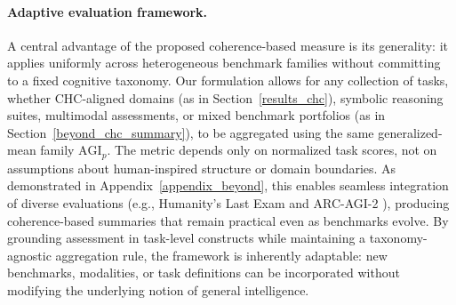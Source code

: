 \documentclass{article}
\begin{document}
\paragraph{Adaptive evaluation framework.}
A central advantage of the proposed coherence-based measure is its generality: it applies uniformly across heterogeneous benchmark families without committing to a fixed cognitive taxonomy. Our formulation allows for any collection of tasks, whether CHC-aligned domains (as in Section~\ref{results_chc}), symbolic reasoning suites, multimodal assessments, or mixed benchmark portfolios (as in Section~\ref{beyond_chc_summary}), to be aggregated using the same generalized-mean family $\mathrm{AGI}_p$. The metric depends only on normalized task scores, not on assumptions about human-inspired structure or domain boundaries. As demonstrated in Appendix~\ref{appendix_beyond}, this enables seamless integration of diverse evaluations (e.g., Humanity's Last Exam \citep{phan2025humanity} and ARC-AGI-2 \citep{chollet2025arc}), producing coherence-based summaries that remain practical even as benchmarks evolve. By grounding assessment in task-level constructs while maintaining a taxonomy-agnostic aggregation rule, the framework is inherently adaptable: new benchmarks, modalities, or task definitions can be incorporated without modifying the underlying notion of general intelligence.



\end{document}
